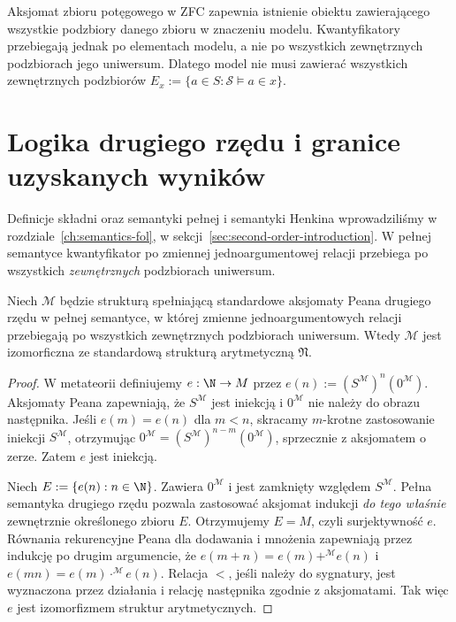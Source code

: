 \begin{uwaga}
\label{rem:skolem-powerset}
Aksjomat zbioru potęgowego w ZFC
zapewnia istnienie obiektu
zawierającego wszystkie podzbiory
danego zbioru w znaczeniu modelu.
Kwantyfikatory przebiegają jednak
po elementach modelu, a nie po
wszystkich zewnętrznych podzbiorach
jego uniwersum. Dlatego model
nie musi zawierać wszystkich
zewnętrznych podzbiorów
$E_x:=\{a\in S:\mathcal S\models a\in x\}$.
\end{uwaga}

\section{Logika drugiego rzędu i granice uzyskanych wyników}
Definicje składni oraz semantyki pełnej
i semantyki Henkina wprowadziliśmy
w rozdziale~\ref{ch:semantics-fol},
w sekcji~\ref{sec:second-order-introduction}.
W pełnej semantyce kwantyfikator
po zmiennej jednoargumentowej relacji
przebiega po wszystkich \emph{zewnętrznych}
podzbiorach uniwersum.

\begin{twierdzenie}
\label{thm:second-order-peano-categorical}
Niech $\mathcal M$ będzie strukturą
spełniającą standardowe aksjomaty
Peana drugiego rzędu w pełnej
semantyce, w której zmienne
jednoargumentowych relacji
przebiegają po wszystkich
zewnętrznych podzbiorach uniwersum.
Wtedy $\mathcal M$ jest izomorficzna
ze standardową strukturą arytmetyczną
$\mathfrak N$.
\end{twierdzenie}
\begin{proof}
W metateorii definiujemy
$e:\N\to M$ przez
$e(n):=(S^{\mathcal M})^n(0^{\mathcal M})$.
Aksjomaty Peana zapewniają, że
$S^{\mathcal M}$ jest iniekcją
i $0^{\mathcal M}$ nie należy
do obrazu następnika.
Jeśli $e(m)=e(n)$ dla $m<n$,
skracamy $m$-krotne zastosowanie
iniekcji $S^{\mathcal M}$,
otrzymując
$0^{\mathcal M}=
(S^{\mathcal M})^{n-m}(0^{\mathcal M})$,
sprzecznie z aksjomatem o zerze.
Zatem $e$ jest iniekcją.

Niech $E:=\{e(n):n\in\N\}$.
Zawiera $0^{\mathcal M}$
i jest zamknięty względem
$S^{\mathcal M}$. Pełna semantyka
drugiego rzędu pozwala zastosować
aksjomat indukcji \emph{do tego właśnie}
zewnętrznie określonego zbioru $E$.
Otrzymujemy $E=M$,
czyli surjektywność $e$.
Równania rekurencyjne Peana dla
dodawania i mnożenia zapewniają
przez indukcję po drugim argumencie,
że $e(m+n)=e(m)+^{\mathcal M}e(n)$
i $e(mn)=e(m)\cdot^{\mathcal M}e(n)$.
Relacja $<$, jeśli należy do
sygnatury, jest wyznaczona
przez działania i relację
następnika zgodnie z aksjomatami.
Tak więc $e$ jest izomorfizmem
struktur arytmetycznych.
\end{proof}

